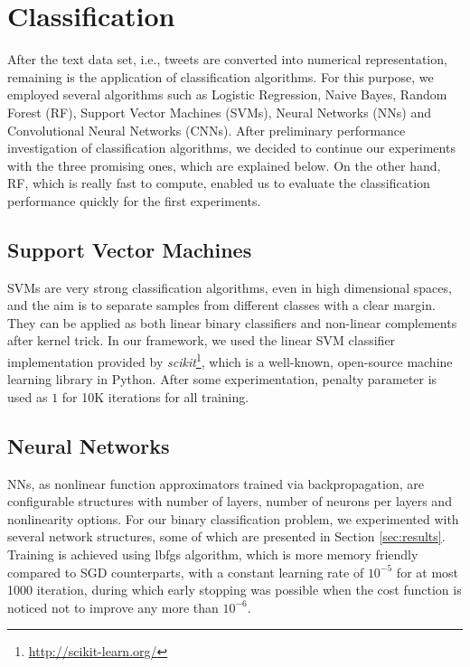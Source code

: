 \section{Classification}
\label{sec:modelSelection}
After the text data set, i.e., tweets are converted into numerical representation, remaining is the application of classification algorithms.
For this purpose, we employed several algorithms such as Logistic Regression, Naive Bayes, Random Forest (RF), Support Vector Machines (SVMs), Neural Networks (NNs) and Convolutional Neural Networks (CNNs).
After preliminary performance investigation of classification algorithms, we decided to continue our experiments with the three promising ones, which are explained below.
On the other hand, RF, which is really fast to compute, enabled us to evaluate the classification performance quickly for the first experiments.

\subsection{Support Vector Machines}
SVMs are very strong classification algorithms, even in high dimensional spaces, and the aim is to separate samples from different classes with a clear margin.
They can be applied as both linear binary classifiers and non-linear complements after kernel trick.
In our framework, we used the linear SVM classifier implementation provided by \textit{scikit}\footnote{\url{http://scikit-learn.org/}}, which is a well-known, open-source machine learning library in Python.
After some experimentation, penalty parameter is used as $1$ for 10K iterations for all training.


\subsection{Neural Networks}
NNs, as nonlinear function approximators trained via backpropagation, are configurable structures with number of layers, number of neurons per layers and nonlinearity options.
For our binary classification problem, we experimented with several network structures, some of which are presented in Section \ref{sec:results}.
Training is achieved using lbfgs algorithm, which is more memory friendly compared to SGD counterparts, with a constant learning rate of $10^{-5}$ for at most 1000 iteration, during which early stopping was possible when the cost function is noticed not to improve any more than $10^{-6}$.

